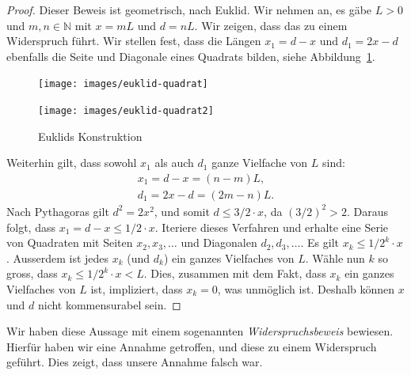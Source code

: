 \documentclass[../main.tex]{subfiles}
\begin{document}
\begin{proof}
  Dieser Beweis ist geometrisch, nach Euklid. Wir nehmen an, es gäbe $L > 0$ und
  $m,n \in \mathbb N$ mit $x = mL$ und $d = nL$. Wir zeigen, dass das zu einem Widerspruch
  führt.
  Wir stellen fest, dass die Längen $x_{1} = d-x$ und $d_{1} = 2x - d$
  ebenfalls die Seite und Diagonale eines Quadrats bilden, siehe
  Abbildung~\ref{fig:euklid}.

  \begin{figure}[htb]
    \centering
    \begin{minipage}{0.4\linewidth}
      \centering
      \texttt{[image: images/euklid-quadrat]}
    \end{minipage}%
    \begin{minipage}{0.4\linewidth}
      \centering
      \texttt{[image: images/euklid-quadrat2]}
    \end{minipage}
    \caption{Euklids Konstruktion}%
    \label{fig:euklid}
  \end{figure}

  Weiterhin gilt, dass sowohl $x_{1}$ als auch $d_{1}$ ganze Vielfache von $L$ sind:
  \begin{align*}
    x_{1} = d-x = (n-m)L, \\
    d_{1} = 2x-d = (2m -n)L.
  \end{align*}
  Nach Pythagoras gilt $d^{2} = 2x^{2}$, und somit $d \leq 3/2\cdot x$, da ${(3/2)}^{2} > 2$.
  Daraus folgt, dass
  \(x_{1} = d - x \leq 1/2 \cdot x\).
  Iteriere dieses Verfahren und erhalte eine Serie von Quadraten mit Seiten
  $x_{2}, x_{3}, \dots$ und Diagonalen $d_{2}, d_{3}, \dots$. Es gilt
  \(x_{k} \leq 1/2^k \cdot x\).
  Ausserdem ist jedes $x_{k}$ (und $d_{k}$) ein ganzes Vielfaches von $L$.
  Wähle nun $k$ so gross, dass
   \(x_{k} \leq 1/2^{k}\cdot x < L\).
   Dies, zusammen mit dem Fakt, dass
   $x_{k}$ ein ganzes Vielfaches von $L$ ist,
   impliziert, dass $x_{k} = 0$, was unmöglich ist. Deshalb können $x$ und $d$
   nicht kommensurabel sein.
\end{proof}

Wir haben diese Aussage mit einem sogenannten \emph{Widerspruchsbeweis} bewiesen.
Hierfür haben wir eine Annahme getroffen, und diese zu einem Widerspruch geführt.
Dies zeigt, dass unsere Annahme falsch war.
\end{document}

